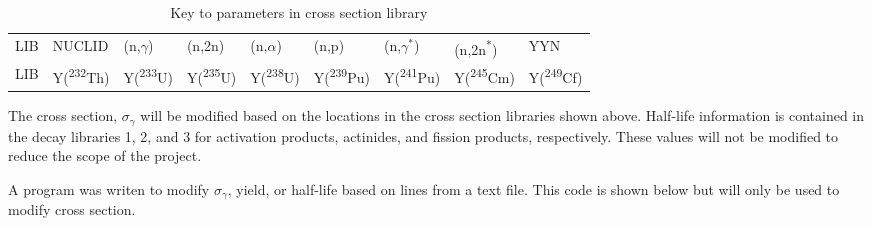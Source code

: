 \documentclass[11pt,notitlepage]{article}
\newcommand{\tss}{\textsuperscript}
\newcommand{\inputdeckpages}[4]{
\begin{itemize}
\item[]
\end{itemize}
}
\begin{document}
\begin{todolist}
  \begin{table}[H]
  \begin{center}
    \caption{Key to parameters in cross section library}
    \label{Table:2}
    \begin{tabular}{l l l l l l l l l}
      \toprule
      LIB & NUCLID & (n,$\gamma$) & (n,2n) & (n,$\alpha$) &
      (n,p) & (n,$\gamma^*$) & (n,2n\tss{*}) & YYN\\
      LIB & Y(\tss{232}Th) & Y(\tss{233}U) & Y(\tss{235}U) &
      Y(\tss{238}U) & Y(\tss{239}Pu) & Y(\tss{241}Pu) &
      Y(\tss{245}Cm) & Y(\tss{249}Cf)\\
      \bottomrule
    \end{tabular}
  \end{center}
  \end{table}

  The cross section, $\sigma_\gamma$ will be modified based on the
  locations in the cross section libraries shown above.
  Half-life information is contained in the decay
  libraries 1, 2, and 3 for activation products, actinides,
  and fission products, respectively. These values will
  not be modified to reduce the scope of the project.

  


  A program was writen to modify $\sigma_\gamma$, yield,
  or half-life based on lines from a text file. This code is
  shown below but will only be used to modify cross section.


\end{todolist}
\end{document}
